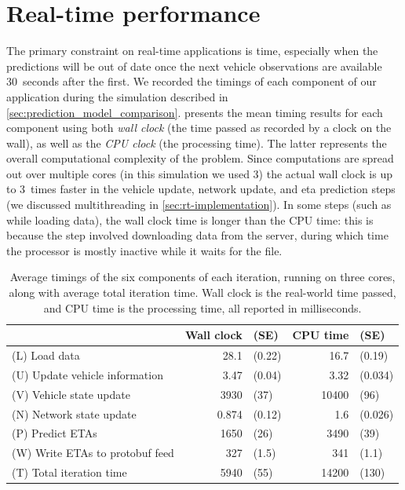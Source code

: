 \section{Real-time performance}
\label{sec:prediction_performance}

The primary constraint on real-time applications is time, especially when the predictions will be out of date once the next vehicle observations are available 30~seconds after the first. We recorded the timings of each component of our application during the simulation described in \cref{sec:prediction_model_comparison}.  presents the mean timing results for each component using both \emph{wall clock} (the time passed as recorded by a clock on the wall), as well as the \emph{CPU clock} (the processing time). The latter represents the overall computational complexity of the problem. Since computations are spread out over multiple cores (in this simulation we used 3)  the actual wall clock is up to 3~times faster in the vehicle update, network update, and \gls{eta} prediction steps (we discussed multithreading in \cref{sec:rt-implementation}). In some steps (such as while loading data), the wall clock time is longer than the CPU time: this is because the step involved downloading data from the server, during which time the processor is mostly inactive while it waits for the file.



\begin{knitrout}\small
{}\color{fgcolor}\begin{table}

\caption[Average timings of the six components of each iteration, running on three cores, along with average total iteration time]{\label{tab:prediction_timing}Average timings of the six components of each iteration, running on three cores, along with average total iteration time. Wall clock is the real-world time passed, and CPU time is the processing time, all reported in milliseconds.}
\centering
\fontsize{8}{10}\selectfont
\begin{tabular}[t]{lrlrl}
\toprule
 & Wall clock & (SE) & CPU time & (SE)\\
\midrule
(L) Load data & 28.1 & (0.22) & 16.7 & (0.19)\\
(U) Update vehicle information & 3.47 & (0.04) & 3.32 & (0.034)\\
(V) Vehicle state update & 3930 & (37) & 10400 & (96)\\
(N) Network state update & 0.874 & (0.12) & 1.6 & (0.026)\\
(P) Predict ETAs & 1650 & (26) & 3490 & (39)\\
\addlinespace
(W) Write ETAs to protobuf feed & 327 & (1.5) & 341 & (1.1)\\
\midrule
(T) Total iteration time & 5940 & (55) & 14200 & (130)\\
\bottomrule
\end{tabular}
\end{table}


\end{knitrout}


